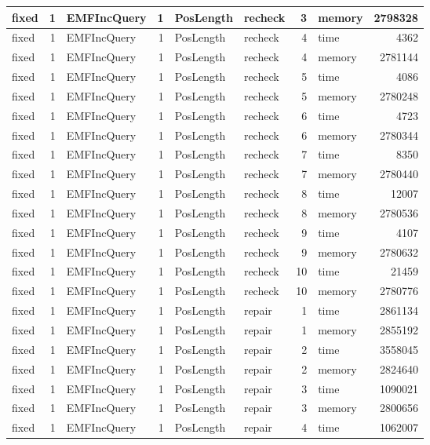 \documentclass[submission,copyright,creativecommons]{eptcs}
\begin{document}
\begin{table}
\begin{tabular}{| l | r | l | r | l | l | r | l | r |}
fixed & 1 & EMFIncQuery & 1 & PosLength & recheck & 3 & memory & 2798328\\\hline
fixed & 1 & EMFIncQuery & 1 & PosLength & recheck & 4 & time & 4362\\\hline
fixed & 1 & EMFIncQuery & 1 & PosLength & recheck & 4 & memory & 2781144\\\hline
fixed & 1 & EMFIncQuery & 1 & PosLength & recheck & 5 & time & 4086\\\hline
fixed & 1 & EMFIncQuery & 1 & PosLength & recheck & 5 & memory & 2780248\\\hline
fixed & 1 & EMFIncQuery & 1 & PosLength & recheck & 6 & time & 4723\\\hline
fixed & 1 & EMFIncQuery & 1 & PosLength & recheck & 6 & memory & 2780344\\\hline
fixed & 1 & EMFIncQuery & 1 & PosLength & recheck & 7 & time & 8350\\\hline
fixed & 1 & EMFIncQuery & 1 & PosLength & recheck & 7 & memory & 2780440\\\hline
fixed & 1 & EMFIncQuery & 1 & PosLength & recheck & 8 & time & 12007\\\hline
fixed & 1 & EMFIncQuery & 1 & PosLength & recheck & 8 & memory & 2780536\\\hline
fixed & 1 & EMFIncQuery & 1 & PosLength & recheck & 9 & time & 4107\\\hline
fixed & 1 & EMFIncQuery & 1 & PosLength & recheck & 9 & memory & 2780632\\\hline
fixed & 1 & EMFIncQuery & 1 & PosLength & recheck & 10 & time & 21459\\\hline
fixed & 1 & EMFIncQuery & 1 & PosLength & recheck & 10 & memory & 2780776\\\hline
fixed & 1 & EMFIncQuery & 1 & PosLength & repair & 1 & time & 2861134\\\hline
fixed & 1 & EMFIncQuery & 1 & PosLength & repair & 1 & memory & 2855192\\\hline
fixed & 1 & EMFIncQuery & 1 & PosLength & repair & 2 & time & 3558045\\\hline
fixed & 1 & EMFIncQuery & 1 & PosLength & repair & 2 & memory & 2824640\\\hline
fixed & 1 & EMFIncQuery & 1 & PosLength & repair & 3 & time & 1090021\\\hline
fixed & 1 & EMFIncQuery & 1 & PosLength & repair & 3 & memory & 2800656\\\hline
fixed & 1 & EMFIncQuery & 1 & PosLength & repair & 4 & time & 1062007\\\hline

\end{tabular}
\end{table}
\end{document}
